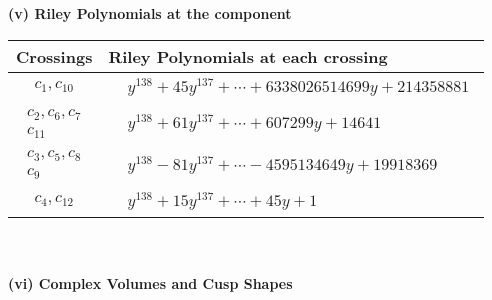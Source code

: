 \documentclass[1p]{elsarticle_modified}
\theoremstyle{definition}
\begin{document}
\newpage\renewcommand{\arraystretch}{1}
\flushleft \textbf{(v) Riley Polynomials at the component}\newline \\
\begin{tabular}{m{50pt}|m{274pt}}
Crossings & \hspace{64pt}Riley Polynomials at each crossing \\
\hline $$\begin{aligned}c_{1},c_{10}\end{aligned}$$&$\begin{aligned}
&y^{138}+45 y^{137}+\cdots+6338026514699 y+214358881
\end{aligned}$\\
\hline $$\begin{aligned}c_{2},c_{6},c_{7}\\c_{11}\end{aligned}$$&$\begin{aligned}
&y^{138}+61 y^{137}+\cdots+607299 y+14641
\end{aligned}$\\
\hline $$\begin{aligned}c_{3},c_{5},c_{8}\\c_{9}\end{aligned}$$&$\begin{aligned}
&y^{138}-81 y^{137}+\cdots-4595134649 y+19918369
\end{aligned}$\\
\hline $$\begin{aligned}c_{4},c_{12}\end{aligned}$$&$\begin{aligned}
&y^{138}+15 y^{137}+\cdots+45 y+1
\end{aligned}$\\
\hline
\end{tabular}\\~\\
\newpage\flushleft \textbf{(vi) Complex Volumes and Cusp Shapes}
\end{document}
